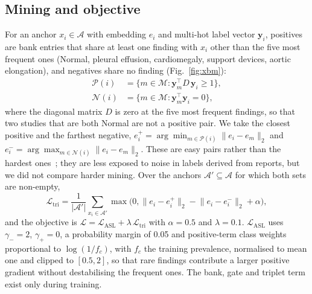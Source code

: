 \documentclass{article}
\begin{document}
\subsection{Mining and objective}
\label{sec:mining}
For an anchor $x_i\in\mathcal{A}$ with embedding $e_i$ and multi-hot label vector $\mathbf{y}_i$, positives are bank entries that share at least one finding with $x_i$ other than the five most frequent ones (Normal, pleural effusion, cardiomegaly, support devices, aortic elongation), and negatives share no finding (Fig.~\ref{fig:xbm}):
\begin{equation}
\begin{aligned}
\mathcal{P}(i)&=\{m\in\mathcal{M}:\mathbf{y}_m^{\top}D\,\mathbf{y}_i\ge 1\},\\
\mathcal{N}(i)&=\{m\in\mathcal{M}:\mathbf{y}_m^{\top}\mathbf{y}_i=0\},
\end{aligned}
\label{eq:posneg}
\end{equation}
where the diagonal matrix $D$ is zero at the five most frequent findings, so that two studies that are both Normal are not a positive pair. We take the closest positive and the farthest negative, $e_i^{+}=\arg\min_{m\in\mathcal{P}(i)}\lVert e_i-e_m\rVert_2$ and $e_i^{-}=\arg\max_{m\in\mathcal{N}(i)}\lVert e_i-e_m\rVert_2$. These are easy pairs rather than the hardest ones~\cite{hermans2017defense}; they are less exposed to noise in labels derived from reports, but we did not compare harder mining. Over the anchors $\mathcal{A}'\subseteq\mathcal{A}$ for which both sets are non-empty,
\begin{equation}
\mathcal{L}_{\mathrm{tri}}=\frac{1}{|\mathcal{A}'|}\sum_{x_i\in\mathcal{A}'}\max\bigl(0,\lVert e_i-e_i^{+}\rVert_2-\lVert e_i-e_i^{-}\rVert_2+\alpha\bigr),
\label{eq:triplet}
\end{equation}
and the objective is $\mathcal{L}=\mathcal{L}_{\mathrm{ASL}}+\lambda\,\mathcal{L}_{\mathrm{tri}}$ with $\alpha=0.5$ and $\lambda=0.1$. $\mathcal{L}_{\mathrm{ASL}}$ uses $\gamma_-=2$, $\gamma_+=0$, a probability margin of 0.05 and positive-term class weights proportional to $\log(1/f_c)$, with $f_c$ the training prevalence, normalised to mean one and clipped to $[0.5,2]$, so that rare findings contribute a larger positive gradient without destabilising the frequent ones. The bank, gate and triplet term exist only during training.
\end{document}
